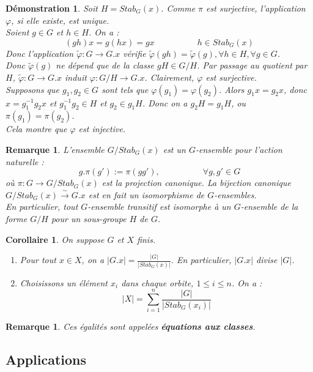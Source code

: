 \documentclass[a4paper, oneside]{report}
\theoremstyle{break}
\newtheorem{cor}[thm]{Corollaire}
\newtheorem{remar}[thm]{Remarque}
\newtheorem*{demo}{Démonstration}
\newcommand{\fong}{\overset{\sim}{\rightarrow}}
\begin{document}
\begin{demo}
	Soit $H=Stab_G(x)$. Comme $\pi$ est surjective, l'application $\varphi$, si elle existe, est unique.\\
	Soient $g\in G$ et $h\in H$. On a :
	$$(gh)x = g(hx)=gx\hspace{5em}h\in Stab_G(x)$$
	Donc l'application $\tilde{\varphi}: G\rightarrow G.x$ vérifie $\tilde{\varphi}(gh)=\tilde{\varphi}(g), \forall h\in H, \forall g\in G$.\\
	Donc $\tilde{\varphi}(g)$ ne dépend que de la classe $gH\in G/H$. Par passage au quotient par $H$, $\tilde{\varphi}:G \rightarrow G.x$ induit $\varphi :G/H \rightarrow G.x$. Clairement, $\varphi$ est surjective.\\
	Supposons que $g_1, g_2\in G$ sont tels que $\varphi(g_1)=\varphi(g_2)$. Alors $g_1x=g_2x$, donc $x=g_1^{-1}g_2x$ et $g_1^{-1}g_2\in H$ et $g_2\in g_1H$. Donc on a $g_2H=g_1H$, ou $\pi(g_1)=\pi(g_2)$.\\
	Cela montre que $\varphi$ est injective.
\end{demo}

\begin{remar}
	L'ensemble $G/Stab_G(x)$ est un $G$-ensemble pour l'action naturelle :
	$$ g.\pi(g') := \pi(gg'),\hspace{5em}\forall g,g'\in G$$
	où $\pi : G\rightarrow G/Stab_G(x)$ est la projection canonique. La bijection canonique $G/Stab_G(x)\fong G.x$ est en fait un isomorphisme de $G$-ensembles.\\
	En particulier, tout $G$-ensemble transitif est isomorphe à un $G$-ensemble de la forme $G/H$ pour un sous-groupe $H$ de $G$.
\end{remar}

\begin{cor}
	On suppose $G$ et $X$ finis.
	\begin{enumerate}
		\item Pour tout $x\in X$, on a $|G.x|=\frac{|G|}{|Stab_G(x)|}$. En particulier, $|G.x|$ divise $|G|$.
		\item Choisissons un élément $x_i$ dans chaque orbite, $1\leq i \leq n$. On a :
		$$|X|=\sum_{i=1}^{n}\frac{|G|}{|Stab_G(x_i)|}$$
	\end{enumerate}
\end{cor}

\begin{remar}
	Ces égalités sont appelées \textbf{équations aux classes}.
\end{remar}

\subsection{Applications}
\end{document}
